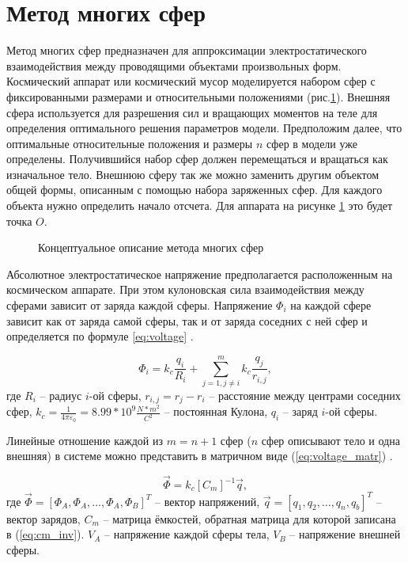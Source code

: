 \section{Метод многих сфер}

Метод многих сфер предназначен для аппроксимации электростатического взаимодействия между проводящими объектами произвольных форм.
Космический аппарат или космический мусор моделируется набором сфер с фиксированными размерами и относительными положениями (рис.\ref{ris:sp_msm}).
Внешняя сфера используется для разрешения сил и вращающих моментов на теле для определения оптимального решения параметров модели.
Предположим далее, что оптимальные относительные положения и размеры $n$ сфер в модели уже определены.
Получившийся набор сфер должен перемещаться и вращаться как изначальное тело.
Внешнюю сферу так же можно заменить другим объектом общей формы, описанным с помощью набора заряженных сфер.
Для каждого объекта нужно определить начало отсчета. Для аппарата на рисунке \ref{ris:sp_msm} это будет точка $O$. 

\begin{figure}[H]
	\caption{Концептуальное описание метода многих сфер}
	\label{ris:sp_msm}
\end{figure}

Абсолютное электростатическое напряжение предполагается расположенным на космическом аппарате.
При этом кулоновская сила взаимодействия между сферами зависит от заряда каждой сферы.
Напряжение $\Phi_i$ на каждой сфере зависит как от заряда самой сферы, так и от заряда соседних с ней сфер и определяется по формуле \ref{eq:voltage} \cite{2sph}.

\begin{equation}
\label{eq:voltage}
	\Phi_i = k_c \frac{q_i}{R_i} + \sum_{j=1,j\neq i}^{m} k_c \frac{q_j}{r_{i,j}},
\end{equation}
где $R_i$ – радиус $i$-ой сферы, $r_{i,j} = r_j - r_i$ – расстояние между центрами соседних сфер, $k_c = \frac{1}{4\pi\varepsilon_0} = 8.99 * 10^9 \frac{N*m^2}{C^2}$ – постоянная Кулона, $q_i$ – заряд $i$-ой сферы.

Линейные отношение каждой из $m = n + 1$ сфер ($n$ сфер описывают тело и одна внешняя) в системе можно представить в матричном виде (\ref{eq:voltage_matr}) \cite{msm}.

\begin{equation}
\label{eq:voltage_matr}
	\vec{\Phi} = k_c [C_m]^{-1} \vec{q},
\end{equation}
где $\vec{\Phi} = [\Phi_A, \Phi_A, \dots, \Phi_A, \Phi_B]^T$ – вектор напряжений, $\vec{q} = [q_1, q_2, \dots, q_n, q_b]^T$ – вектор зарядов, $C_m$ – матрица ёмкостей, обратная матрица для которой записана в (\ref{eq:cm_inv}).
$V_A$ – напряжение каждой сферы тела, $V_B$ – напряжение внешней сферы.

